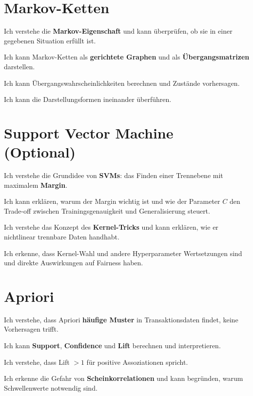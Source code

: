 \section{Markov-Ketten}
\begin{todolist}
    \item Ich verstehe die \textbf{Markov-Eigenschaft} und kann überprüfen, ob sie in einer gegebenen Situation erfüllt ist.
    \item Ich kann Markov-Ketten als \textbf{gerichtete Graphen} und als \textbf{Übergangsmatrizen} darstellen.
    \item Ich kann Übergangswahrscheinlichkeiten berechnen und Zustände vorhersagen.
    \item Ich kann die Darstellungsformen ineinander überführen.
\end{todolist}

\section{Support Vector Machine (Optional)}
\begin{todolist}
    \item Ich verstehe die Grundidee von \textbf{SVMs}: das Finden einer Trennebene mit maximalem \textbf{Margin}.
    \item Ich kann erklären, warum der Margin wichtig ist und wie der Parameter $C$ den Trade-off zwischen Trainingsgenauigkeit und Generalisierung steuert.
    \item Ich verstehe das Konzept des \textbf{Kernel-Tricks} und kann erklären, wie er nichtlinear trennbare Daten handhabt.
    \item Ich erkenne, dass Kernel-Wahl und andere Hyperparameter Wertsetzungen sind und direkte Auswirkungen auf Fairness haben.
\end{todolist}

\section{Apriori}
\begin{todolist}
    \item Ich verstehe, dass Apriori \textbf{häufige Muster} in Transaktionsdaten findet, keine Vorhersagen trifft.
    \item Ich kann \textbf{Support}, \textbf{Confidence} und \textbf{Lift} berechnen und interpretieren.
    \item Ich verstehe, dass Lift $> 1$ für positive Assoziationen spricht.
    \item Ich erkenne die Gefahr von \textbf{Scheinkorrelationen} und kann begründen, warum Schwellenwerte notwendig sind.
\end{todolist}

